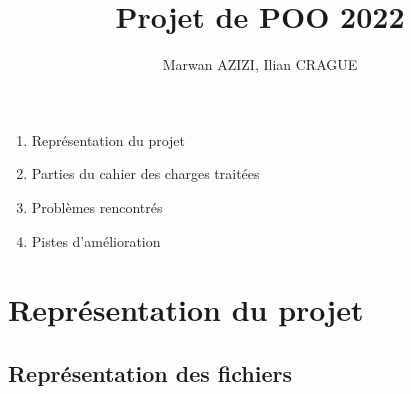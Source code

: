\documentclass{article}
\title{Projet de POO 2022}
\author{Marwan AZIZI, Ilian CRAGUE }
\begin{document}
\maketitle

\begin{enumerate}
  \item Représentation du projet
  \item Parties du cahier des charges traitées
  \item Problèmes rencontrés
  \item Pistes d'amélioration
\end{enumerate}

\section{Représentation du projet}

\subsection{Représentation des fichiers}
\end{document}
